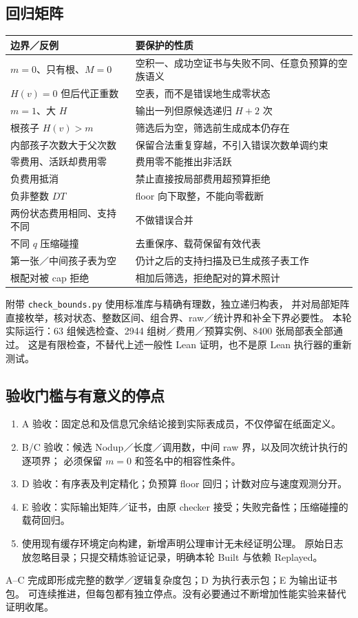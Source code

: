 \documentclass[UTF8,a4paper,11pt]{ctexart}
\theoremstyle{definition}
\begin{document}
\subsection{回归矩阵}
\begin{longtable}{p{}p{}}
\toprule 边界／反例 & 要保护的性质 \\ \midrule
$m=0$、只有根、$M=0$ & 空积一、成功空证书与失败不同、任意负预算的空族语义 \\
$H(v)=0$ 但后代正重数 & 空表，而不是错误地生成零状态 \\
$m=1$、大 $H$ & 输出一列但原候选递归 $H+2$ 次 \\
根孩子 $H(v)>m$ & 筛选后为空，筛选前生成成本仍存在 \\
内部孩子次数大于父次数 & 保留合法重复穿越，不引入错误次数单调约束 \\
零费用、活跃却费用零 & 费用零不能推出非活跃 \\
负费用抵消 & 禁止直接按局部费用超预算拒绝 \\
负非整数 $DT$ & floor 向下取整，不能向零截断 \\
两份状态费用相同、支持不同 & 不做错误合并 \\
不同 $q$ 压缩碰撞 & 去重保序、载荷保留有效代表 \\
第一张／中间孩子表为空 & 仍计之后的支持扫描及已生成孩子表工作 \\
根配对被 cap 拒绝 & 相加后筛选，拒绝配对的算术照计 \\
\bottomrule
\end{longtable}

附带 \texttt{check\_bounds.py} 使用标准库与精确有理数，独立递归构表，
并对局部矩阵直接枚举，核对状态、整数区间、组合界、raw／统计界和补全下界必要性。
本轮实际运行：63 组候选检查、2944 组树／费用／预算实例、8400 张局部表全部通过。
这是有限检查，不替代上述一般性 Lean 证明，也不是原 Lean 执行器的重新测试。

\subsection{验收门槛与有意义的停点}
\begin{enumerate}
\item A 验收：固定总和及信息冗余结论接到实际表成员，不仅停留在纸面定义。
\item B/C 验收：候选 Nodup／长度／调用数，中间 raw 界，以及同次统计执行的逐项界；
必须保留 $m=0$ 和签名中的相容性条件。
\item D 验收：有序表及判定精化；负预算 floor 回归；计数对应与速度观测分开。
\item E 验收：实际输出矩阵／证书，由原 checker 接受；失败完备性；压缩碰撞的载荷回归。
\item 使用现有缓存环境定向构建，新增声明公理审计无未经证明公理。
原始日志放忽略目录；只提交精炼验证记录，明确本轮 Built 与依赖 Replayed。
\end{enumerate}
A--C 完成即形成完整的数学／逻辑复杂度包；D 为执行表示包；E 为输出证书包。
可连续推进，但每包都有独立停点。没有必要通过不断增加性能实验来替代证明收尾。
\end{document}
